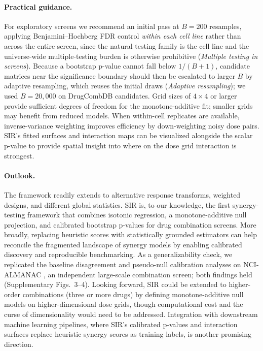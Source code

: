 \documentclass[unnumsec,webpdf,contemporary,large]{oup-authoring-template}
\begin{document}
\paragraph{Practical guidance.}
For exploratory screens we recommend an initial pass at $B=200$ resamples, applying Benjamini--Hochberg FDR control \emph{within each cell line} rather than across the entire screen, since the natural testing family is the cell line and the universe-wide multiple-testing burden is otherwise prohibitive (\emph{Multiple testing in screens}).
Because a bootstrap p-value cannot fall below $1/(B+1)$, candidate matrices near the significance boundary should then be escalated to larger $B$ by adaptive resampling, which reuses the initial draws (\emph{Adaptive resampling}); we used $B=20{,}000$ on DrugCombDB candidates.
Grid sizes of $4\times 4$ or larger provide sufficient degrees of freedom for the monotone-additive fit; smaller grids may benefit from reduced models.
When within-cell replicates are available, inverse-variance weighting improves efficiency by down-weighting noisy dose pairs.
SIR's fitted surfaces and interaction maps can be visualized alongside the scalar p-value to provide spatial insight into where on the dose grid interaction is strongest.

\paragraph{Outlook.}
The framework readily extends to alternative response transforms, weighted designs, and different global statistics.
SIR is, to our knowledge, the first synergy-testing framework that combines isotonic regression, a monotone-additive null projection, and calibrated bootstrap p-values for drug combination screens.
More broadly, replacing heuristic scores with statistically grounded estimators can help reconcile the fragmented landscape of synergy models \cite{Greco1995,Meyer2020,PalmerSorger2017} by enabling calibrated discovery and reproducible benchmarking.
As a generalizability check, we replicated the baseline disagreement and pseudo-null calibration analyses on NCI-ALMANAC \cite{Holbeck2017}, an independent large-scale combination screen; both findings held (Supplementary Figs.~3--4).
Looking forward, SIR could be extended to higher-order combinations (three or more drugs) by defining monotone-additive null models on higher-dimensional dose grids, though computational cost and the curse of dimensionality would need to be addressed.
Integration with downstream machine learning pipelines, where SIR's calibrated p-values and interaction surfaces replace heuristic synergy scores as training labels, is another promising direction.
\end{document}
